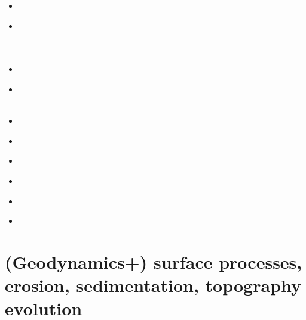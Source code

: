 \begin{scriptsize}
\begin{itemize}
\\
\item[\twothousandthirteen] 
\item[\twothousandfourteen] 
\\
\\
\\
\item[\twothousandfifteen] 
\item[\twothousandsixteen] 
\\
\\
\item[\twothousandseventeen] 
\item[\twothousandeighteen] 
 \\
\item[\twothousandnineteen] 
 \\
\item[\twothousandtwenty] 
 \\
\item[\twothousandtwentytwo] 
\item[\twothousandtwentythree] 
 \\ 
\end{itemize}
\end{scriptsize}

\section{(Geodynamics+) surface processes, erosion, sedimentation, topography evolution}

